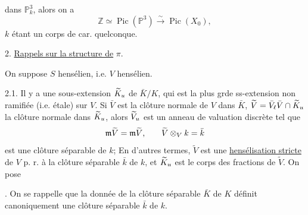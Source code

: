 dans $\mathbb P^3_k$, alors on a
\[
 \mathbb Z\simeq\operatorname{Pic}(\mathbb P^3)\xrightarrow{\sim}\operatorname{Pic}(X_0),
\]
$k$ étant un corps de car. quelconque.

2. \uline{Rappels sur la structure de} $\pi$.

On suppose $S$ hensélien, i.e. $V$ hensélien.

2.1. Il y a une sous-extension $\widetilde K_{{{u}}}$ de $\bar K/K$, qui est la plus grde ss-extension non ramifiée (i.e. étale)  sur $V$. Si  $\bar V$ est la clôture normale de $V$ dans $\bar K$, $\widetilde V={{\bar V_\ell}}\bar V\cap\widetilde K_{{{u}}}$ la clôture normale dans $\widetilde K_{{{u}}}$, alors $\widetilde V_{{{u}}}$ est un anneau de valuation discrète tel que
\[
 {{\mathfrak m}\widetilde V=\mathfrak m\widetilde V,}
 \qquad \widetilde V\otimes_V k=\bar k
\]
est une  clôture séparable de $k$; En d'autres termes, $\widetilde V$ est une \uline{hensélisation stricte} de $V$ p. r. à  la  clôture séparable $\bar k$ de $k$, et $\widetilde K_{{{u}}}$ est le corps des fractions de $\widetilde V$. On pose
\inserted{
\[
\begin{cases}
\widetilde S=\operatorname{Spec}\widetilde V=\text{hensélisé strict de }S\\
\unsure{\bar s}=\operatorname{Spec}\bar k.
\end{cases}
\]
}

. On se rappelle que  la donnée de la clôture séparable $\bar K$ de $K$ définit canoniquement une clôture séparable $\bar k$ de $k$.


